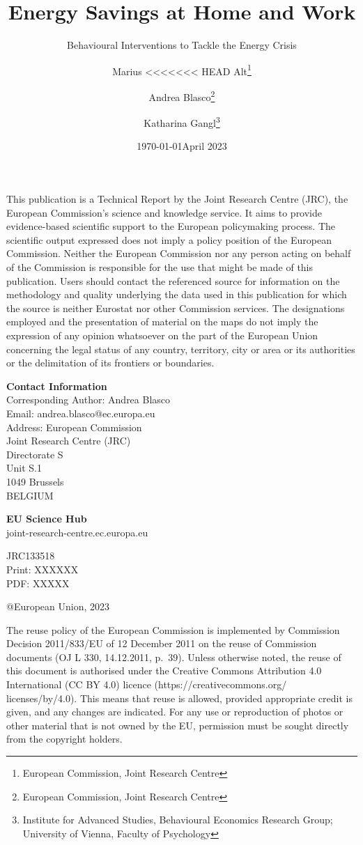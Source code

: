 \documentclass[
  12pt,
  captions=heading]{scrreport}
\title{Energy Savings at Home and Work}
\subtitle{Behavioural Interventions to Tackle the Energy Crisis}
\author{Marius
<<<<<<< HEAD
Alt\thanks{European Commission, Joint Research Centre} \and Andrea
Blasco\thanks{European Commission, Joint Research Centre} \and Katharina
Gangl\thanks{Institute for Advanced Studies, Behavioural Economics Research Group; University of Vienna, Faculty of Psychology}}
\date{\today}
\date{April 2023}
\begin{document}
\maketitle

\newcommand{\smallnotice}{\footnotesize} 
\newcommand{\smallnoticebd}{\footnotesize\textbf}

{
\setcounter{tocdepth}{2}
\tableofcontents
}
\clearpage

\smallnotice This publication is a Technical Report by the Joint
Research Centre (JRC), the European Commission's science and knowledge
service. It aims to provide evidence-based scientific support to the
European policymaking process. The scientific output expressed does not
imply a policy position of the European Commission. Neither the European
Commission nor any person acting on behalf of the Commission is
responsible for the use that might be made of this publication. Users
should contact the referenced source for information on the methodology
and quality underlying the data used in this publication for which the
source is neither Eurostat nor other Commission services. The
designations employed and the presentation of material on the maps do
not imply the expression of any opinion whatsoever on the part of the
European Union concerning the legal status of any country, territory,
city or area or its authorities or the delimitation of its frontiers or
boundaries.

\textbf{Contact Information}\\
Corresponding Author: Andrea Blasco\\
Email: andrea.blasco@ec.europa.eu\\
Address: European Commission\\
Joint Research Centre (JRC)\\
Directorate S\\
Unit S.1\\
1049 Brussels\\
BELGIUM

\textbf{EU Science Hub}\\
joint-research-centre.ec.europa.eu

JRC133518\\
Print: XXXXXX\\
PDF: XXXXX

@European Union, 2023

\smallnotice The reuse policy of the European Commission is implemented
by Commission Decision 2011/833/EU of 12 December 2011 on the reuse of
Commission documents (OJ L 330, 14.12.2011, p.~39). Unless otherwise
noted, the reuse of this document is authorised under the Creative
Commons Attribution 4.0 International (CC BY 4.0) licence
(https://creativecommons.org/ licenses/by/4.0). This means that reuse is
allowed, provided appropriate credit is given, and any changes are
indicated. For any use or reproduction of photos or other material that
is not owned by the EU, permission must be sought directly from the
copyright holders.
\end{document}
